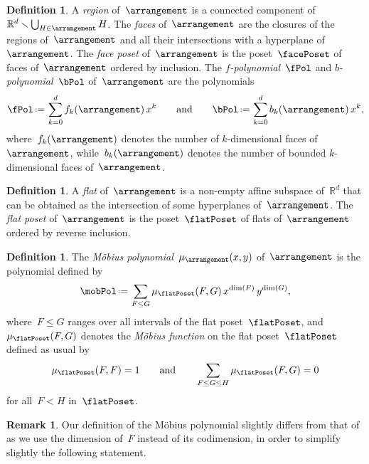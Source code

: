 \documentclass{amsart}
\newcommand{\darkblue}{\color{darkblue}} %
\theoremstyle{definition}
\newtheorem{definition}[theorem]{Definition}
\newtheorem{remark}[theorem]{Remark}
\newcommand{\R}{\mathbb{R}} %
\newcommand{\ssm}{\smallsetminus} %
\newcommand{\eqdef}{\mbox{\,\raisebox{0.2ex}{\scriptsize\ensuremath{\mathrm:}}\ensuremath{=}\,}} %
\newcommand{\defn}[1]{\textsl{\darkblue #1}} %
\begin{document}
\begin{definition}
A \defn{region} of~$\arrangement$ is a connected component of~$\R^d \ssm \bigcup_{H \in \arrangement} H$.
The \defn{faces} of~$\arrangement$ are the closures of the regions of~$\arrangement$ and all their intersections with a hyperplane of~$\arrangement$.
The \defn{face poset} of~$\arrangement$ is the poset~$\facePoset$ of faces of~$\arrangement$ ordered by inclusion.
The \defn{$f$-polynomial}~$\fPol$ and \defn{$b$-polynomial}~$\bPol$ of~$\arrangement$ are the polynomials
\[
\fPol \eqdef \sum_{k = 0}^d f_k(\arrangement) \, x^k
\qquad\text{and}\qquad
\bPol \eqdef \sum_{k = 0}^d b_k(\arrangement) \, x^k ,
\]
where~$f_k(\arrangement)$ denotes the number of $k$-dimensional faces of~$\arrangement$, while~$b_k(\arrangement)$ denotes the number of bounded $k$-dimensional faces of~$\arrangement$.
\end{definition}

\begin{definition}
A \defn{flat} of~$\arrangement$ is a non-empty affine subspace of~$\R^d$ that can be obtained as the intersection of some hyperplanes of~$\arrangement$.
The \defn{flat poset} of~$\arrangement$ is the poset~$\flatPoset$ of flats of~$\arrangement$ ordered by reverse inclusion.
\end{definition}

\begin{definition}
\label{def:MobiusPolynomial}
The \defn{M\"obius polynomial}~$\mu_{\arrangement}(x,y)$ of~$\arrangement$ is the polynomial defined by
\[
\mobPol \eqdef \sum_{F \le G} \mu_{\flatPoset}(F,G) \, x^{\dim(F)} \, y^{\dim(G)},
\]
where~$F \le G$ ranges over all intervals of the flat poset~$\flatPoset$, and~$\mu_{\flatPoset}(F,G)$ denotes the \defn{M\"obius function} on the flat poset~$\flatPoset$ defined as usual by
\[
\mu_{\flatPoset}(F, F) = 1
\qquad\text{and}\qquad
\sum_{F \le G \le H} \mu_{\flatPoset}(F,G) = 0
\]
for all~$F < H$ in~$\flatPoset$.
\end{definition}

\begin{remark}
Our definition of the M\"obius polynomial slightly differs from that of~\cite{Zaslavsky} as we use the dimension of~$F$ instead of its codimension, in order to simplify slightly the following statement.
\end{remark}
\end{document}
